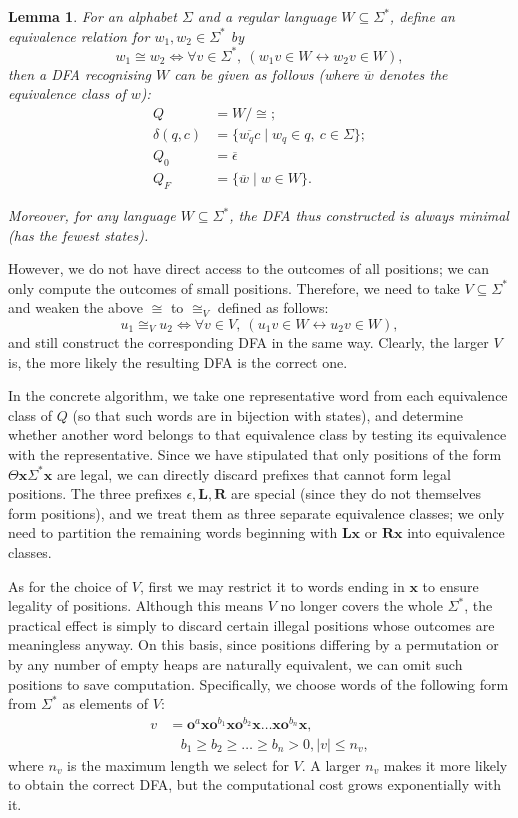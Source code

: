 \documentclass[11pt]{article}
\newtheorem{lemma}{Lemma}[section]
\theoremstyle{definition}
\theoremstyle{plain}
\newcommand{\rmL}{\mathbf{L}}
\newcommand{\rmR}{\mathbf{R}}
\newcommand{\x}{\mathbf{x}}
\newcommand{\e}{\mathbf{o}}
\begin{document}
\begin{lemma}\label{build_fa}
    For an alphabet $\varSigma$ and a regular language $W\subseteq \varSigma^*$, define an equivalence relation for $w_1, w_2\in \varSigma^*$ by
    \[
        w_1 \cong w_2 \iff \forall v\in \varSigma^*,\ (w_1 v\in W \leftrightarrow w_2 v\in W),
    \]
    then a DFA recognising $W$ can be given as follows (where $\overline{w}$ denotes the equivalence class of $w$):
    \begin{align*}
        Q &= W / \cong; \\
        \delta(q, c) &= \{\overline{w_q c} \mid w_q\in q,\ c\in\varSigma\}; \\
        Q_0 &= \overline{\epsilon} \\
        Q_F &= \{ \overline{w} \mid w\in W\}.
    \end{align*}

    Moreover, for any language $W\subseteq \varSigma^*$, the DFA thus constructed is always minimal (has the fewest states).
\end{lemma}

However, we do not have direct access to the outcomes of all positions; we can only compute the outcomes of small positions.
Therefore, we need to take $V\subseteq\varSigma^*$ and weaken the above $\cong$ to $\cong_{V}$ defined as follows:
\[
    u_1 \cong_V u_2 \iff \forall v\in V,\ (u_1 v\in W \leftrightarrow u_2 v\in W),
\]
and still construct the corresponding DFA in the same way. Clearly, the larger $V$ is, the more likely the resulting DFA is the correct one.

In the concrete algorithm, we take one representative word from each equivalence class of $Q$ (so that such words are in bijection with states), and determine whether another word belongs to that equivalence class by testing its equivalence with the representative.
Since we have stipulated that only positions of the form $\varTheta\x\varSigma^*\x$ are legal, we can directly discard prefixes that cannot form legal positions.
The three prefixes $\epsilon, \rmL, \rmR$ are special (since they do not themselves form positions), and we treat them as three separate equivalence classes;
we only need to partition the remaining words beginning with $\rmL\x$ or $\rmR\x$ into equivalence classes.

As for the choice of $V$, first we may restrict it to words ending in $\x$ to ensure legality of positions. Although this means $V$ no longer covers the whole $\varSigma^*$, the practical effect is simply to discard certain illegal positions whose outcomes are meaningless anyway.
On this basis, since positions differing by a permutation or by any number of empty heaps are naturally equivalent, we can omit such positions to save computation.
Specifically, we choose words of the following form from $\varSigma^*$ as elements of $V$:
\begin{align*}
    v &= \e^a \x \e^{b_1}\x \e^{b_2}\x \ldots \x \e^{b_n}\x, \\
      &~~~~ b_1\geq b_2\geq\ldots\geq b_n >0, |v|\leq n_v,
\end{align*}
where $n_v$ is the maximum length we select for $V$. A larger $n_v$ makes it more likely to obtain the correct DFA, but the computational cost grows exponentially with it.
\end{document}
